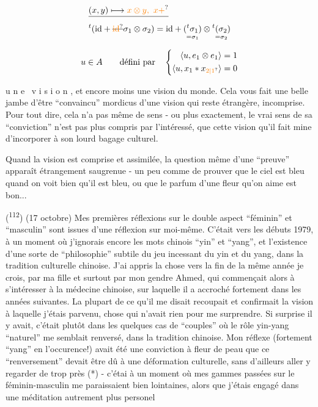 \[
\begin{aligned}
&\deleted{(x,y)\longmapsto \unsure{x\otimes y,\ x+}}\\
&{}^t(\mathrm{id}+\deleted{\unsure{\mathrm{id}}}\sigma_1\otimes\sigma_2)
=\mathrm{id}+\underset{=\sigma_1}{({}^t\sigma_1)}\otimes\underset{=\sigma_2}{{}^t(\sigma_2)}
\end{aligned}
\]

\qquad{}

\[
u\in A\qquad\text{défini par}\quad
\left\{\begin{aligned}
\langle u,e_1\otimes e_1\rangle&=1\\
\langle u,x_1*x_{\unsure{2|1}}\rangle&=0
\end{aligned}\right.
\]


u n e \ v i s i o n , et encore moins une vision du monde. Cela vous fait une belle jambe d'être ``convaincu'' mordicus d'une vision qui reste étrangère, incomprise. Pour tout dire, cela n'a pas même de sens - ou plus exactement, le vrai sens de sa ``conviction'' n'est pas plus compris par l'intéressé, que cette vision qu'il fait mine d'incorporer à son lourd bagage culturel.

Quand la vision est comprise et assimilée, la question même d'une ``preuve'' apparaît étrangement saugrenue - un peu comme de prouver que le ciel est bleu quand on voit bien qu'il est bleu, ou que le parfum d'une fleur qu'on aime est bon...


(\textsuperscript{112}) (17 octobre) Mes premières réflexions sur le double aspect ``féminin'' et ``masculin'' sont issues d'une réflexion sur moi-même. C'était vers les débuts 1979, à un moment où j'ignorais encore les mots chinois ``yin'' et ``yang'', et l'existence d'une sorte de ``philosophie'' subtile du jeu incessant du yin et du yang, dans la tradition culturelle chinoise. J'ai appris la chose vers la fin de la même année je crois, par ma fille et surtout par mon gendre Ahmed, qui commençait alors à s'intéresser à la médecine chinoise, sur laquelle il a accroché fortement dans les années suivantes. La plupart de ce qu'il me disait recoupait et confirmait la vision à laquelle j'étais parvenu, chose qui n'avait rien pour me surprendre. Si surprise il y avait, c'était plutôt dans les quelques cas de ``couples'' où le rôle yin-yang ``naturel'' me semblait renversé, dans la tradition chinoise. Mon réflexe (fortement ``yang'' en l'occurence!) avait été une conviction à fleur de peau que ce ``renversement'' devait être dû à une déformation culturelle, sans d'ailleurs aller y regarder de trop près (*) - c'étai à un moment où mes gammes passées sur le féminin-masculin me paraissaient bien lointaines, alors que j'étais engagé dans une méditation autrement plus personel\unsure{-}

